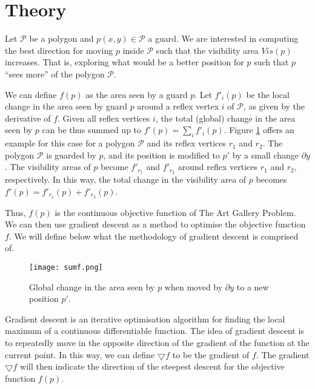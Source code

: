 \section{Theory}


Let $\mathcal P$ be a polygon and $p(x, y) \in \mathcal P$ a guard. We are interested in computing the best direction for moving $p$ inside $\mathcal P$ such that the visibility area $Vis(p)$ increases. That is, exploring what would be a better position for $p$ such that $p$ ``sees more'' of the polygon $\mathcal P$. 

We can define $f(p)$ as the area seen by a guard $p$. Let $f'_i(p)$ be the local change in the area seen by guard $p$ around a reflex vertex $i$ of $\mathcal P$, as given by the derivative of $f$. Given all reflex vertices $i$, the total (global) change in the area seen by $p$ can be thus summed up to $f'(p) = \sum_i f'_i(p)$. Figure \ref{fig:sumf} offers an example for this case for a polygon $\mathcal P$ and its reflex vertices $r_1$ and $r_2$. The polygon $\mathcal P$ is guarded by $p$, and its position is modified to $p'$ by a small change $\partial y$. The visibility areas of $p$ become $f'_{r_1}$ and $f'_{r_2}$ around reflex vertices $r_1$ and $r_2$, respectively. In this way, the total change in the visibility area of $p$ becomes $f'(p) = f'_{r_1}(p) + f'_{r_2}(p)$.

Thus, $f(p)$ is the continuous objective function of The Art Gallery Problem. We can then use gradient descent as a method to optimise the objective function $f$. We will define below what the methodology of gradient descent is comprised of.

\begin{figure}[h!]
    \centering
    \texttt{[image: sumf.png]}
    \caption{Global change in the area seen by $p$ when moved by $\partial y$ to a new position $p'$.}
    \label{fig:sumf}
\end{figure}

Gradient descent is an iterative optimisation algorithm for finding the local maximum of a continuous differentiable function. The idea of gradient descent is to repeatedly move in the opposite direction of the gradient of the function at the current point. In this way, we can define $\bigtriangledown f$ to be the gradient of $f$. The gradient $\bigtriangledown f$ will then indicate the direction of the steepest descent for the objective function $f(p)$. 



